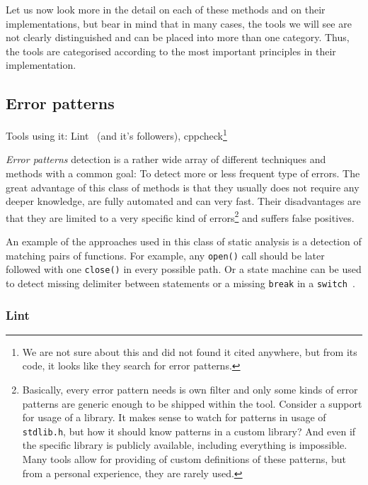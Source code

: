 Let us now look more in the detail on each of these methods and on their implementations, but bear in mind that in many cases, the tools we will see are not clearly distinguished and can be placed into more than one category. Thus, the tools are categorised according to the most important principles in their implementation.

\subsection{Error patterns}

Tools using it: Lint~\cite{KrenaVojnarOverview} (and it's followers), cppcheck\footnote{We are not sure about this and did not found it cited anywhere, but from its code, it looks like they search for error patterns.}

{\em Error patterns} detection is a rather wide array of different techniques and methods with a common goal: To detect more or less frequent type of errors. The great advantage of this class of methods is that they usually does not require any deeper knowledge, are fully automated and can very fast. Their disadvantages are that they are limited to a very specific kind of errors\footnote{Basically, every error pattern needs is own filter and only some kinds of error patterns are generic enough to be shipped within the tool. Consider a support for usage of a library. It makes sense to watch for patterns in usage of {\tt stdlib.h}, but how it should know patterns in a custom library? And even if the specific library is publicly available, including everything is impossible. Many tools allow for providing of custom definitions of these patterns, but from a personal experience, they are rarely used.} and suffers false positives.

An example of the approaches used in this class of static analysis is a detection of matching pairs of functions. For example, any {\tt open()} call should be later followed with one {\tt close()} in every possible path. Or a state machine can be used to detect missing delimiter between statements or a missing {\tt break} in a {\tt switch}~\cite{dynamine}.

\subsubsection{Lint}


